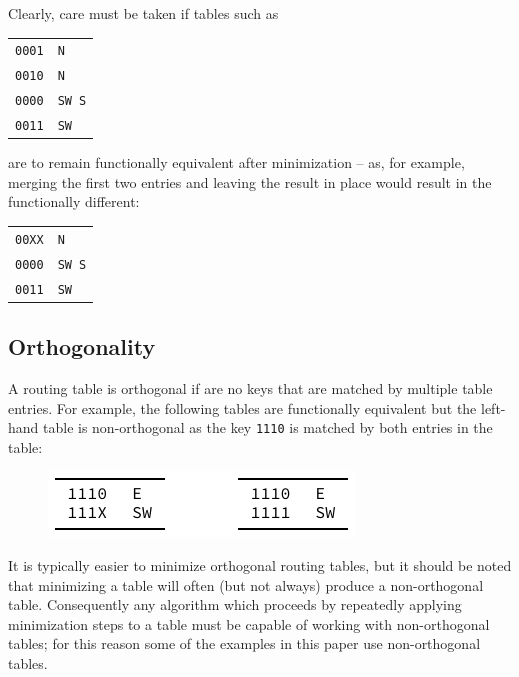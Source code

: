 \documentclass[conference]{IEEEtran}
\newcommand{\mytt}[1]{\texttt{\footnotesize#1}}
\begin{document}
  Clearly, care must be taken if tables such as

  \begin{table}[H]
    \centering
    \begin{tabular}{c l}
      \toprule
      \texttt{0001} & \texttt{N}\\
      \texttt{0010} & \texttt{N}\\
      \texttt{0000} & \texttt{SW S}\\
      \texttt{0011} & \texttt{SW}\\
      \bottomrule
    \end{tabular}
  \end{table}

  \noindent are to remain functionally equivalent after minimization -- as, for example, merging the first two entries and leaving the result in place would result in the functionally different:

  \begin{table}[H]
    \centering
    \begin{tabular}{c l}
      \toprule
      \texttt{00XX} & \texttt{N}\\
      \texttt{0000} & \texttt{SW S}\\
      \texttt{0011} & \texttt{SW}\\
      \bottomrule
    \end{tabular}
  \end{table}

  \subsection{Orthogonality}

  A routing table is orthogonal if are no keys that are matched by multiple table entries.
  For example, the following tables are functionally equivalent but the left-hand table is non-orthogonal as the key \mytt{1110} is matched by both entries in the table:

  \begin{figure}[H]
    \centering
    \includegraphics{figures/orthogonality}
  \end{figure}

  It is typically easier to minimize orthogonal routing tables, but it should be noted that minimizing a table will often (but not always) produce a non-orthogonal table.
  Consequently any algorithm which proceeds by repeatedly applying minimization steps to a table must be capable of working with non-orthogonal tables; for this reason some of the examples in this paper use non-orthogonal tables.
\end{document}
